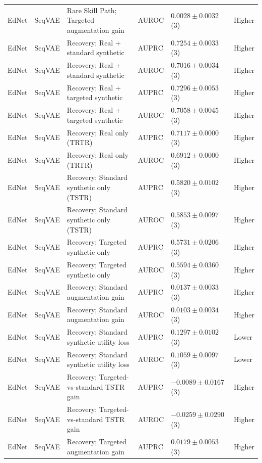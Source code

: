 \begin{longtable}{@{}p{2.25cm}p{2.05cm}p{4.7cm}p{5.0cm}p{2.6cm}p{1.25cm}@{}}
EdNet & SeqVAE & Rare Skill Path; Targeted augmentation gain & AUROC & $0.0028 \mathbin{\pm} 0.0032$ (3) & Higher \\
EdNet & SeqVAE & Recovery; Real + standard synthetic & AUPRC & $0.7254 \mathbin{\pm} 0.0033$ (3) & Higher \\
EdNet & SeqVAE & Recovery; Real + standard synthetic & AUROC & $0.7016 \mathbin{\pm} 0.0034$ (3) & Higher \\
EdNet & SeqVAE & Recovery; Real + targeted synthetic & AUPRC & $0.7296 \mathbin{\pm} 0.0053$ (3) & Higher \\
EdNet & SeqVAE & Recovery; Real + targeted synthetic & AUROC & $0.7058 \mathbin{\pm} 0.0045$ (3) & Higher \\
EdNet & SeqVAE & Recovery; Real only (TRTR) & AUPRC & $0.7117 \mathbin{\pm} 0.0000$ (3) & Higher \\
EdNet & SeqVAE & Recovery; Real only (TRTR) & AUROC & $0.6912 \mathbin{\pm} 0.0000$ (3) & Higher \\
EdNet & SeqVAE & Recovery; Standard synthetic only (TSTR) & AUPRC & $0.5820 \mathbin{\pm} 0.0102$ (3) & Higher \\
EdNet & SeqVAE & Recovery; Standard synthetic only (TSTR) & AUROC & $0.5853 \mathbin{\pm} 0.0097$ (3) & Higher \\
EdNet & SeqVAE & Recovery; Targeted synthetic only & AUPRC & $0.5731 \mathbin{\pm} 0.0206$ (3) & Higher \\
EdNet & SeqVAE & Recovery; Targeted synthetic only & AUROC & $0.5594 \mathbin{\pm} 0.0360$ (3) & Higher \\
EdNet & SeqVAE & Recovery; Standard augmentation gain & AUPRC & $0.0137 \mathbin{\pm} 0.0033$ (3) & Higher \\
EdNet & SeqVAE & Recovery; Standard augmentation gain & AUROC & $0.0103 \mathbin{\pm} 0.0034$ (3) & Higher \\
EdNet & SeqVAE & Recovery; Standard synthetic utility loss & AUPRC & $0.1297 \mathbin{\pm} 0.0102$ (3) & Lower \\
EdNet & SeqVAE & Recovery; Standard synthetic utility loss & AUROC & $0.1059 \mathbin{\pm} 0.0097$ (3) & Lower \\
EdNet & SeqVAE & Recovery; Targeted-vs-standard TSTR gain & AUPRC & $-0.0089 \mathbin{\pm} 0.0167$ (3) & Higher \\
EdNet & SeqVAE & Recovery; Targeted-vs-standard TSTR gain & AUROC & $-0.0259 \mathbin{\pm} 0.0290$ (3) & Higher \\
EdNet & SeqVAE & Recovery; Targeted augmentation gain & AUPRC & $0.0179 \mathbin{\pm} 0.0053$ (3) & Higher \\

\end{longtable}
